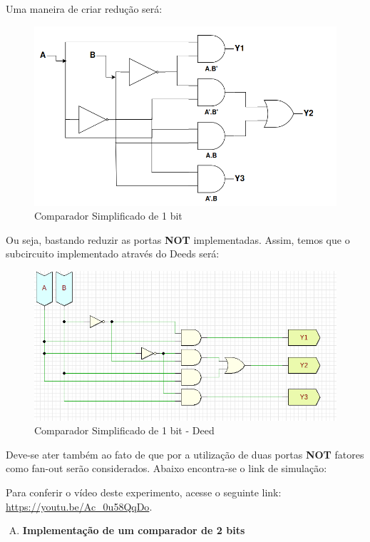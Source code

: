 \documentclass[12pt]{article}
\begin{document}
Uma maneira de criar redução será:
\begin{figure}[H]
    \centering
    \includegraphics[width=.9\textwidth]{Exp04/Comparador1Simplificado.png}
    \caption{Comparador Simplificado de 1 bit}\label{fig:Comparador1Bit.png}
\end{figure}

Ou seja, bastando reduzir as portas \textbf{NOT} implementadas. Assim, temos que o subcircuito implementado através do Deeds será:

\begin{figure}[H]
    \centering
    \includegraphics[width=.9\textwidth]{Exp04/Exp4.2.2.2.png}
    \caption{Comparador Simplificado de 1 bit - Deed}\label{fig:Comparador1Bit.png}
\end{figure}

Deve-se ater também ao fato de que por a utilização de duas portas \textbf{NOT} fatores como fan-out serão considerados.
Abaixo encontra-se o link de simulação:

Para conferir o vídeo deste experimento, acesse o seguinte link:
\href{https://youtu.be/Ac_0u58QqDo}{https://youtu.be/Ac_0u58QqDo}.

\begin{enumerate}[C)]
\item \textbf{Implementação de um comparador de 2 bits}
\end{enumerate}
\end{document}
